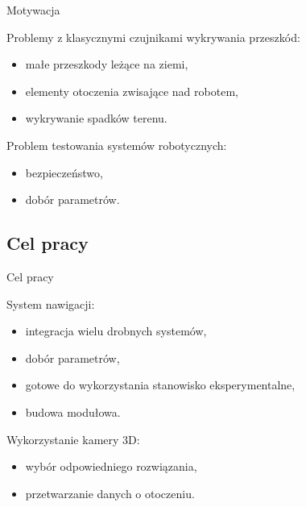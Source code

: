\documentclass[xcolor=x11names,compress]{beamer}
\renewcommand{\(}{\begin{columns}}
\renewcommand{\)}{\end{columns}}
\newcommand{\<}[1]{\begin{column}{#1}}
\renewcommand{\>}{\end{column}}
\begin{document}
\begin{frame}{Motywacja}

\alert{Problemy z klasycznymi czujnikami wykrywania przeszkód:}
\begin{itemize}
\item małe przeszkody leżące na ziemi,
\item elementy otoczenia zwisające nad robotem,
\item wykrywanie spadków terenu.
\end{itemize}

\vspace{.5cm}

\alert{Problem testowania systemów robotycznych:}
\begin{itemize}
\item bezpieczeństwo,
\item dobór parametrów.
\end{itemize}

\end{frame}

\subsection{Cel pracy}

\begin{frame}{Cel pracy}

\alert{System nawigacji:}
\begin{itemize}
\item integracja wielu drobnych systemów,
\item dobór parametrów,
\item gotowe do wykorzystania stanowisko eksperymentalne,
\item budowa modułowa.
\end{itemize}

\vspace{.5cm}

\alert{Wykorzystanie kamery 3D:}
\begin{itemize}
\item wybór odpowiedniego rozwiązania,
\item przetwarzanie danych o otoczeniu.
\end{itemize}

\end{frame}

\end{document}
